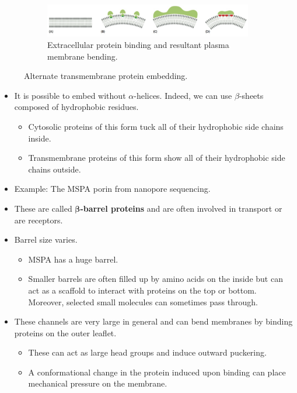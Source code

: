 \documentclass[../notes.tex]{subfiles}
\begin{document}
\begin{itemize}
\begin{figure}[h!]
        \begin{subfigure}[b]{\linewidth}
            \centering
            \includegraphics[width=0.7\linewidth]{../ExtFiles/alternateProteinEmbeddingb.png}
            \caption{Extracellular protein binding and resultant plasma membrane bending.}
            \label{fig:alternateProteinEmbeddingb}
        \end{subfigure}
        \caption{Alternate transmembrane protein embedding.}
        \label{fig:alternateProteinEmbedding}
    \end{figure}
    \begin{itemize}
        \item It is possible to embed without $\alpha$-helices. Indeed, we can use $\beta$-sheets composed of hydrophobic residues.
        \begin{itemize}
            \item Cytosolic proteins of this form tuck all of their hydrophobic side chains inside.
            \item Transmembrane proteins of this form show all of their hydrophobic side chains outside.
        \end{itemize}
        \item Example: The MSPA porin from nanopore sequencing.
        \item These are called \textbf{$\bm{\beta}$-barrel proteins} and are often involved in transport or are receptors.
        \item Barrel size varies.
        \begin{itemize}
            \item MSPA has a huge barrel.
            \item Smaller barrels are often filled up by amino acids on the inside but can act as a scaffold to interact with proteins on the top or bottom. Moreover, selected small molecules can sometimes pass through.
        \end{itemize}
        \item These channels are very large in general and can bend membranes by binding proteins on the outer leaflet.
        \begin{itemize}
            \item These can act as large head groups and induce outward puckering.
            \item A conformational change in the protein induced upon binding can place mechanical pressure on the membrane.

\end{itemize}
\end{itemize}
\end{itemize}
\end{document}
